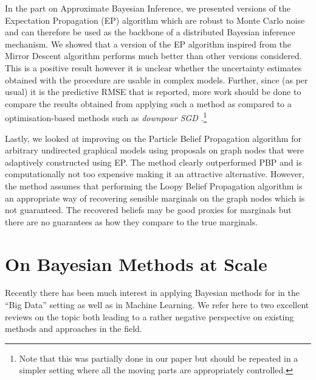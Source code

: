 In the part on Approximate Bayesian Inference, we presented versions of the Expectation Propagation (EP) algorithm which are robust to Monte Carlo noise and can therefore be used as the backbone of a distributed Bayesian inference mechanism. We showed that a version of the EP algorithm inspired from the Mirror Descent algorithm performs much better than other versions considered. This is a positive result however it is unclear whether the uncertainty estimates obtained with the procedure are usable in complex models. Further, since (as per usual) it is the predictive RMSE that is reported, more work should be done to compare the results obtained from applying such a method as compared to a optimisation-based methods such as \emph{downpour SGD} \citep{dean12}.\footnote{Note that this was partially done in our paper \citep{hasenclever16} but should be repeated in a simpler setting where all the moving parts are appropriately controlled.} 

Lastly, we looked at improving on the Particle Belief Propagation algorithm for arbitrary undirected graphical models using proposals on graph nodes that were adaptively constructed using EP. The method clearly outperformed PBP and is computationally not too expensive making it an attractive alternative. However, the method assumes that performing the Loopy Belief Propagation algorithm is an appropriate way of recovering sensible marginals on the graph nodes which is not guaranteed. The recovered beliefs may be good proxies for marginals but there are no guarantees as how they compare to the true marginals.

\section{On Bayesian Methods at Scale}

Recently there has been much interest in applying Bayesian methods for in the ``Big Data'' setting as well as in Machine Learning. We refer here to two excellent reviews on the topic \citet{green15, bardenet17} both leading to a rather negative perspective on existing methods and approaches in the field. 

